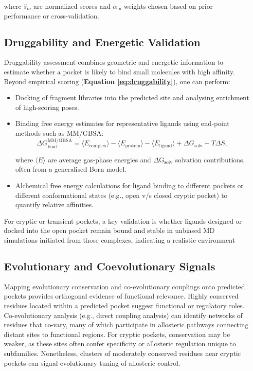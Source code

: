 \documentclass[12pt]{article}
\begin{document}
where $\hat{s}_m$ are normalized scores and $\alpha_\textrm{m}$ weights chosen based on prior performance or cross-validation.

\subsection{Druggability and Energetic Validation}

Druggability assessment combines geometric and energetic information to estimate whether a pocket is likely to bind small molecules with high affinity\cite{CH5_Halgren2009,CH5_LeGuilloux2009}. Beyond empirical scoring (\textbf{Equation \ref{eq:druggability}}), one can perform:
\begin{itemize}
    \item Docking of fragment libraries into the predicted site and analysing enrichment of high-scoring poses.
    \item Binding free energy estimates for representative ligands using end-point methods such as MM/GBSA:
    \begin{equation}
    \Delta G_{\mathrm{bind}}^{\mathrm{MM/GBSA}} = \langle E_{\mathrm{complex}} \rangle - \langle E_{\mathrm{protein}} \rangle - \langle E_{\mathrm{ligand}} \rangle + \Delta G_{\mathrm{solv}} - T \Delta S,
    \end{equation}

    where $\langle E \rangle$ are average gas-phase energies and $\Delta \textrm{G}_{\textrm{solv}}$ solvation contributions, often from a generalised Born model.
    \item Alchemical free energy calculations for ligand binding to different pockets or different conformational states (e.g., open v/s closed cryptic pocket) to quantify relative affinities.
\end{itemize}

For cryptic or transient pockets, a key validation is whether ligands designed or docked into the open pocket remain bound and stable in unbiased MD simulations initiated from those complexes, indicating a realistic environment\cite{CH5_amaro2019will,CH5_Kuzmanic2020}

\subsection{Evolutionary and Coevolutionary Signals}

Mapping evolutionary conservation and co-evolutionary couplings onto predicted pockets provides orthogonal evidence of functional relevance\cite{CH5_ghersi2011beyond}. Highly conserved residues located within a predicted pocket suggest functional or regulatory roles. Co-evolutionary analysis (e.g., direct coupling analysis) can identify networks of residues that co-vary, many of which participate in allosteric pathways connecting distant sites to functional regions. For cryptic pockets, conservation may be weaker, as these sites often confer specificity or allosteric regulation unique to subfamilies. Nonetheless, clusters of moderately conserved residues near cryptic pockets can signal evolutionary tuning of allosteric control\cite{CH5_Gasparikova2025,CH5_zhang2026decrypting}.
\end{document}
